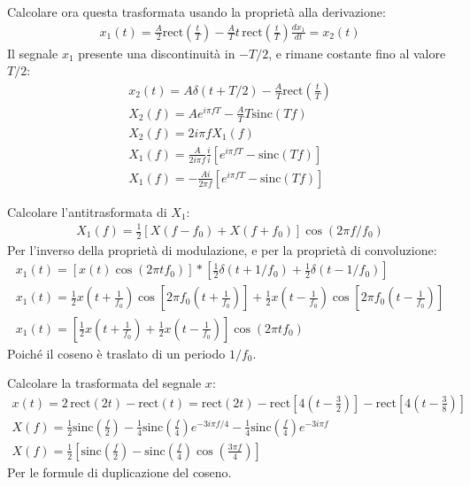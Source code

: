 \documentclass{article}
\numberwithin{equation}{subsection}
\begin{document}
Calcolare ora questa trasformata usando la proprietà alla derivazione:
\begin{gather*}
    x_1(t)=\displaystyle\frac{A}{2}\mbox{rect}\left(\frac{t}{T}\right)-\frac{A}{T}t\,\mbox{rect}\left(\frac{t}{T}\right)
    \displaystyle\frac{dx_1}{dt}=x_2(t)
\end{gather*}
Il segnale $x_1$ presente una discontinuità in $-T/2$, e rimane costante fino al valore $T/2$:
\begin{gather*}
    x_2(t)=A\delta(t+T/2)-\displaystyle\frac{A}{T}\mbox{rect}\left(\frac{t}{T}\right)\\
    X_2(f)=Ae^{i\pi fT}-\displaystyle\frac{A}{T}T\mbox{sinc}(Tf)\\
    X_2(f)=2i\pi fX_1(f)\\
    X_1(f)=\displaystyle\frac{A}{2i\pi f}\frac{i}{i}\left[e^{i\pi fT}-\mbox{sinc}(Tf)\right]\\
    X_1(f)=\displaystyle-\frac{Ai}{2\pi f}\left[e^{i\pi fT}-\mbox{sinc}(Tf)\right]
\end{gather*}


Calcolare l'antitrasformata di $X_1$:
\begin{gather*}
    X_1(f)=\displaystyle\frac{1}{2}\left[X(f-f_0)+X(f+f_0)\right]\cos(2\pi f/f_0)
\end{gather*}
Per l'inverso della proprietà di modulazione, e per la proprietà di convoluzione:
\begin{gather*}
    x_1(t)=\left[x(t)\cos(2\pi tf_0)\right]*\left[\displaystyle\frac{1}{2}\delta(t+1/f_0)+\frac{1}{2}\delta(t-1/f_0)\right]\\
    x_1(t)=\displaystyle\frac{1}{2}x\left(t+\frac{1}{f_0}\right)\cos\left[2\pi f_0\left(t+\frac{1}{f_0}\right)\right]+\frac{1}{2}x\left(t-\frac{1}{f_0}\right)\cos\left[2\pi f_0\left(t-\frac{1}{f_0}\right)\right]\\
    x_1(t)=\left[\displaystyle\frac{1}{2}x\left(t+\frac{1}{f_0}\right)+\frac{1}{2}x\left(t-\frac{1}{f_0}\right)\right]\cos(2\pi tf_0)
\end{gather*}
Poiché il coseno è traslato di un periodo $1/f_0$. 


Calcolare la trasformata del segnale $x$:
\begin{gather*}
    x(t)=2\,\mbox{rect}(2t)-\mbox{rect}(t)=\mbox{rect}(2t)-\mbox{rect}\left[\displaystyle4\left(t-\frac{3}{2}\right)\right]-\mbox{rect}\left[\displaystyle4\left(t-\frac{3}{8}\right)\right]\\
    X(f)=\displaystyle\frac{1}{2}\mbox{sinc}\left(\frac{f}{2}\right)-\frac{1}{4}\mbox{sinc}\left(\frac{f}{4}\right)e^{-3i\pi f/4}-\frac{1}{4}\mbox{sinc}\left(\frac{f}{4}\right)e^{-3i\pi f}\\
    X(f)=\displaystyle\frac{1}{2}\left[\mbox{sinc}\left(\frac{f}{2}\right)-\mbox{sinc}\left(\frac{f}{4}\right)\cos\left(\frac{3\pi f}{4}\right)\right]
\end{gather*}
Per le formule di duplicazione del coseno. 
\end{document}
